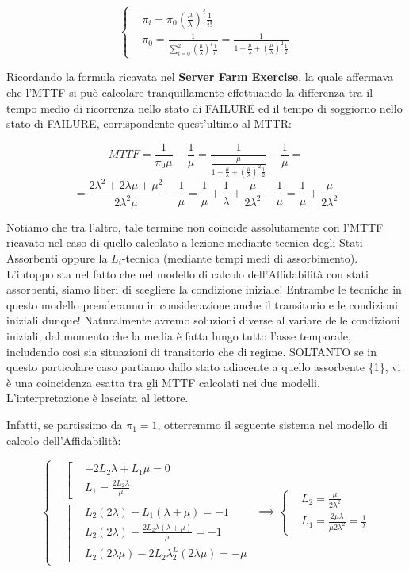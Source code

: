 \[
	\left\{
	\begin{aligned}
	&\pi_i = \pi_0(\frac{\mu}{\lambda})^i \frac{1}{i!}\\
	&\pi_0 = \frac{1}{\sum_{i=0}^2{(\frac{\mu}{\lambda})^i \frac{1}{i!}}} = \frac{1}{1+\frac{\mu}{\lambda} + (\frac{\mu}{\lambda})^2 \frac{1}{2}}
	\end{aligned}
	\right.
\]

Ricordando la formula ricavata nel \textbf{Server Farm Exercise}, la quale affermava che l'MTTF si può calcolare tranquillamente effettuando la differenza tra il tempo medio di ricorrenza nello stato di FAILURE ed il tempo di soggiorno nello stato di FAILURE, corrispondente quest'ultimo al MTTR:

\[
	MTTF = \frac{1}{\pi_0\mu} - \frac{1}{\mu} = \frac{1}{\frac{\mu}{1+\frac{\mu}{\lambda} + (\frac{\mu}{\lambda})^2 \frac{1}{2}}} - \frac{1}{\mu} =
\]
\[
	= \frac{2\lambda^2 + 2\lambda\mu + \mu^2}{2\lambda^2 \mu} - \frac{1}{\mu} = \frac{1}{\mu}+\frac{1}{\lambda}+\frac{\mu}{2\lambda^2} - \frac{1}{\mu} = \frac{1}{\mu} + \frac{\mu}{2\lambda^2}
\]

Notiamo che tra l'altro, tale termine non coincide assolutamente con l'MTTF ricavato nel caso di quello calcolato a lezione mediante tecnica degli Stati Assorbenti oppure la $L_i$-tecnica (mediante tempi medi di assorbimento). L'intoppo sta nel fatto che nel modello di calcolo dell'Affidabilità con stati assorbenti, siamo liberi di scegliere la condizione iniziale! Entrambe le tecniche in questo modello prenderanno in considerazione anche il transitorio e le condizioni iniziali dunque! Naturalmente avremo soluzioni diverse al variare delle condizioni iniziali, dal momento che la media è fatta lungo tutto l'asse temporale, includendo così sia situazioni di transitorio che di regime. SOLTANTO se in questo particolare caso partiamo dallo stato adiacente a quello assorbente \{1\}, vi è una coincidenza esatta tra gli MTTF calcolati nei due modelli. L'interpretazione è lasciata al lettore.

Infatti, se partissimo da $\pi_1=1$, otterremmo il seguente sistema nel modello di calcolo dell'Affidabilità:

\[	
	\left\{
	\begin{aligned}
	&\left[
	\begin{aligned}
	&-2L_2\lambda + L_1\mu=0\\
	&L_1 = \frac{2L_2\lambda}{\mu}
	\end{aligned}
	\right.\\
	&\left[
	\begin{aligned}
	&L_2(2\lambda)-L_1(\lambda+\mu) = -1\\
	&L_2(2\lambda)-\frac{2L_2\lambda(\lambda+\mu)}{\mu} = -1\\
	&L_2(2\lambda\mu)-2L_2\lambda^L_2(2\lambda\mu) = -\mu 
	\end{aligned}
	\right.
	\end{aligned}
	\right.\implies\left\{
	\begin{aligned}
	&L_2=\frac{\mu}{2\lambda^2}\\
	&L_1=\frac{2\mu\lambda}{\mu 2\lambda^2} = \frac{1}{\lambda}
	\end{aligned}
	\right.
\]


